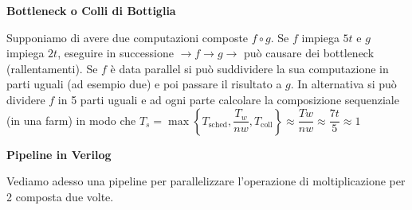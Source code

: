 
\begin{defn}
	\textbf{Bottleneck o Colli di Bottiglia}
	
	Supponiamo di avere due computazioni composte $ f \circ g $. Se $ f $ impiega $ 5t $ e $ g $ impiega $ 2t $, eseguire in successione $ \to f \to g \to $ può causare dei bottleneck (rallentamenti). Se $ f $ è data parallel si può suddividere la sua computazione in parti uguali (ad esempio due) e poi passare il risultato a $ g $. In alternativa si può dividere $ f $ in 5 parti uguali e ad ogni parte calcolare la composizione sequenziale (in una farm) in modo che $ T_s = \max\left\{T_\text{sched}, \dfrac{T_w}{nw}, T_\text{coll}\right\} \approx \dfrac{Tw}{nw} \approx \dfrac{7t}{5} \approx 1$

\end{defn}

\begin{exmp}
	\textbf{Pipeline in Verilog}
	
	Vediamo adesso una pipeline per parallelizzare l'operazione di moltiplicazione per 2 composta due volte.
	
	
	
	
\end{exmp}


